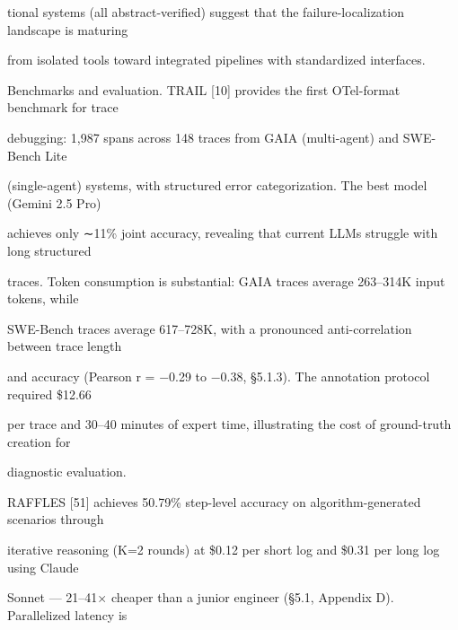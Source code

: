 \begin{flushleft}
\noindent tional systems (all abstract-verified) suggest that the failure-localization landscape is maturing\par
\noindent from isolated tools toward integrated pipelines with standardized interfaces.\par
\par\smallskip
\noindent Benchmarks and evaluation. TRAIL [10] provides the first OTel-format benchmark for trace\par
\noindent debugging: 1,987 spans across 148 traces from GAIA (multi-agent) and SWE-Bench Lite\par
\noindent (single-agent) systems, with structured error categorization. The best model (Gemini 2.5 Pro)\par
\noindent achieves only ∼11\% joint accuracy, revealing that current LLMs struggle with long structured\par
\noindent traces. Token consumption is substantial: GAIA traces average 263–314K input tokens, while\par
\noindent SWE-Bench traces average 617–728K, with a pronounced anti-correlation between trace length\par
\noindent and accuracy (Pearson r = −0.29 to −0.38, §5.1.3). The annotation protocol required \$12.66\par
\noindent per trace and 30–40 minutes of expert time, illustrating the cost of ground-truth creation for\par
\noindent diagnostic evaluation.\par
\noindent  RAFFLES [51] achieves 50.79\% step-level accuracy on algorithm-generated scenarios through\par
\noindent iterative reasoning (K=2 rounds) at \$0.12 per short log and \$0.31 per long log using Claude\par
\noindent Sonnet — 21–41× cheaper than a junior engineer (§5.1, Appendix D). Parallelized latency is\par
\end{flushleft}
